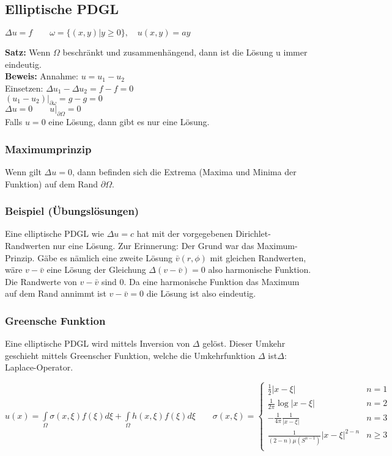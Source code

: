 \subsection{Elliptische PDGL}
$\Delta u=f\qquad \omega=\{(x,y)|y\geq 0\},\quad u(x,y)=ay$

\textbf{Satz:} Wenn $\Omega$ beschränkt und zusammenhängend, dann ist die Lösung u immer eindeutig.\\

\textbf{Beweis:} Annahme: $u=u_1-u_2$\\
Einsetzen: $\Delta u_1 - \Delta u_2=f-f=0$\\
$\left.(u_1-u_2)\right|_{\partial \omega}=g-g=0$\\
$\Delta u=0 \qquad \left.u\right|_{\partial\Omega}=0$\\
Falls $u=0$ eine Lösung, dann gibt es nur eine Lösung.

\subsubsection{Maximumprinzip} 

Wenn gilt $\Delta u=0$, dann befinden sich die Extrema (Maxima und Minima der Funktion) auf dem Rand $\partial\Omega$.

\subsubsection{Beispiel (Übungslösungen)}
Eine elliptische PDGL wie $\Delta u = c$ hat mit der vorgegebenen
Dirichlet-Randwerten nur eine Lösung. Zur Erinnerung: Der Grund war das
Maximum-Prinzip. Gäbe es nämlich eine zweite Lösung $\bar v(r,\phi)$ mit
gleichen Randwerten, wäre $v - \bar v$ eine Lösung der Gleichung $\Delta (v -
\bar v) = 0$ also harmonische Funktion. Die Randwerte von $v - \bar v$ sind 0. Da eine
harmonische Funktion das Maximum auf dem Rand annimmt ist $v - \bar v = 0$ die
Lösung ist also eindeutig.

\newpage
\subsubsection{Greensche Funktion} 

Eine elliptische PDGL wird mittels Inversion von $\Delta$ gelöst. Dieser Umkehr geschieht mittels Greenscher Funktion, welche die Umkehrfunktion $\Delta$ ist\qquad $\Delta$: Laplace-Operator.

$u(x)=\int\limits_\Omega{\sigma(x,\xi)f(\xi)d\xi}+\int\limits_\Omega{h(x,\xi)f(\xi)d\xi}\qquad \sigma(x,\xi)=
\begin{cases}
	\frac 12|x-\xi| & n=1\\ 
	\frac 1{2\pi}\log|x-\xi| & n=2\\
	-\frac 1{4\pi}\frac{1}{|x-\xi|} & n=3\\
	\frac {1}{(2-n)\mu(S^{n-1})}|x-\xi|^{2-n} & n\geq 3\\
\end{cases}$\\


